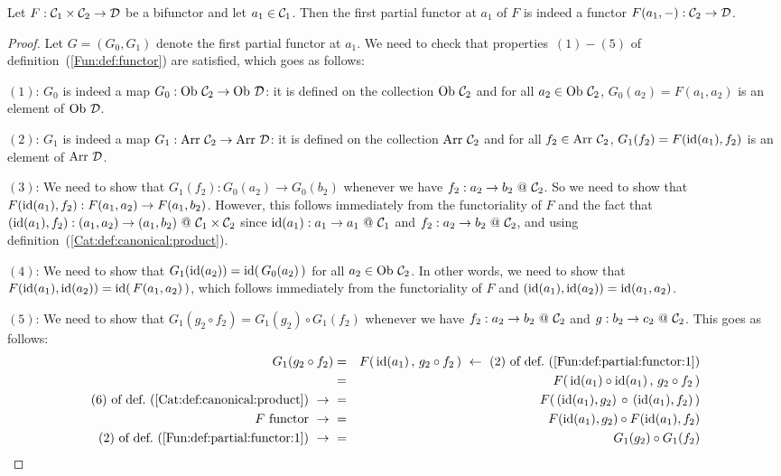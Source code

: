 \begin{prop}\label{Fun:prop:partial:functor:1}
    Let $F:\mbox{${\cal C}_{1}$}\times\mbox{${\cal C}_{2}$}\to\mbox{$\cal D$}$ be a bifunctor and let $a_{1}\in\mbox{${\cal C}_{1}$}$. 
    Then the first partial functor at $a_{1}$ of $F$ is indeed a functor
    $F(a_{1},-):\mbox{${\cal C}_{2}$}\to\mbox{$\cal D$}$.
\end{prop}
\begin{proof}
    Let $G=(G_{0},G_{1})$ denote the first partial functor at $a_{1}$. 
    We need to check that properties~$(1)-(5)$ of 
    definition~(\ref{Fun:def:functor}) are satisfied, which goes as follows:

    $(1)$: $G_{0}$ is indeed a map $G_{0}:\ob\ \Ctwo\to\ob\ \Dat$: it is 
    defined on the collection $\mbox{\rm Ob}\ \mbox{${\cal C}_{2}$}$ and for all $a_{2}\in\mbox{\rm Ob}\ \mbox{${\cal C}_{2}$}$,
    $G_{0}(a_{2})=F(a_{1},a_{2})$ is an element of $\mbox{\rm Ob}\ \mbox{$\cal D$}$.

    $(2)$: $G_{1}$ is indeed a map $G_{1}:\arr\ \Ctwo\to\arr\ \Dat$: it is 
    defined on the collection $\mbox{\rm Arr}\ \mbox{${\cal C}_{2}$}$ and for all $f_{2}\in\mbox{\rm Arr}\ \mbox{${\cal C}_{2}$}$,
    $G_{1}(f_{2})=F(\mbox{\rm id}(a_{1}),f_{2})$ is an element of $\mbox{\rm Arr}\ \mbox{$\cal D$}$.

    $(3)$: We need to show that $G_{1}(f_{2}):G_{0}(a_{2})\to G_{0}(b_{2})$ 
    whenever we have $f_{2}:a_{2}\to b_{2}\ @\ \Ctwo$. So we need to 
    show that $F(\mbox{\rm id}(a_{1}),f_{2}):F(a_{1},a_{2})\to F(a_{1},b_{2})$. However,
    this follows immediately from the functoriality of $F$ and the fact that
    $(\id(a_{1}),f_{2}):(a_{1},a_{2})\to (a_{1},b_{2})\ @\ \Cone\times\Ctwo$
    since $\mbox{\rm id}(a_{1}):a_{1}\to a_{1}\ @\ \mbox{${\cal C}_{1}$}$ and $f_{2}:a_{2}\to b_{2}
    \ @\ \Ctwo$, and using definition~(\ref{Cat:def:canonical:product}).
    
    $(4)$: We need to show that $G_{1}(\mbox{\rm id}(a_{2}))=\mbox{\rm id}(\,G_{0}(a_{2})\,)$ for
    all $a_{2}\in\mbox{\rm Ob}\ \mbox{${\cal C}_{2}$}$. In other words, we need to show that
    $F(\mbox{\rm id}(a_{1}),\mbox{\rm id}(a_{2}))=\mbox{\rm id}(\,F(a_{1},a_{2})\,)$, which follows
    immediately from the functoriality of $F$ and
    $(\mbox{\rm id}(a_{1}),\mbox{\rm id}(a_{2}))=\mbox{\rm id}(a_{1},a_{2})$.

    $(5)$: We need to show that $G_{1}(g_{2}\circ f_{2})=G_{1}(g_{2})
    \circ G_{1}(f_{2})$ whenever we have $f_{2}:a_{2}\to b_{2}\ @\ \Ctwo$ and 
    $g:b_{2}\to c_{2}\ @\ \mbox{${\cal C}_{2}$}$. This goes as follows:
        \begin{eqnarray*}G_{1}(g_{2}\circ f_{2})
            &=&F(\,\id(a_{1})\,,\,g_{2}\circ f_{2}\,)\ \leftarrow\ 
            \mbox{$(2)$ of def.~(\ref{Fun:def:partial:functor:1})}\\
            &=&F(\,\id(a_{1})\circ\id(a_{1})\,,\,g_{2}\circ f_{2}\,)\\
            \mbox{$(6)$ of def.~(\ref{Cat:def:canonical:product})}\ \to\ 
            &=&F(\,(\id(a_{1}),g_{2})\,\circ\,(\id(a_{1}),f_{2})\,)\\
            \mbox{$F$ functor}\ \to\ 
            &=&F(\id(a_{1}),g_{2})\circ F(\id(a_{1}),f_{2})\\
            \mbox{$(2)$ of def.~(\ref{Fun:def:partial:functor:1})}\ \to\ 
            &=&G_{1}(g_{2})\circ G_{1}(f_{2})
        \end{eqnarray*}
\end{proof}

